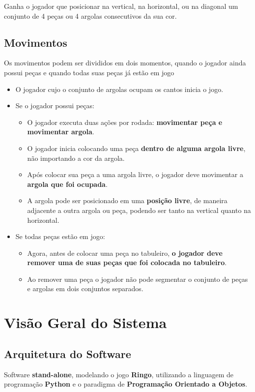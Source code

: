 \documentclass[12pt]{article}
\begin{document}
Ganha o jogador que posicionar na vertical, na horizontal, ou na diagonal um conjunto de 4 peças ou 4 argolas consecutivos da sua cor.

\bigskip

\subsection{Movimentos}

Os movimentos podem ser divididos em dois momentos,
quando o jogador ainda possui peças e quando todas suas peças já estão em jogo

\begin{itemize}
    \item O jogador cujo o conjunto de argolas ocupam os cantos inicia o jogo.
    \item Se o jogador possui peças:

    \begin{itemize}
        \item O jogador executa duas ações por rodada: \textbf{movimentar peça e movimentar argola}.
        \item O jogador inicia colocando uma peça \textbf{dentro de alguma argola livre}, não importando a cor da argola.
        \item Após colocar sua peça a uma argola livre, o jogador deve movimentar a \textbf{argola que foi ocupada}.
        \item A argola pode ser posicionado em uma \textbf{posição livre}, de maneira adjacente a outra argola ou peça, podendo ser tanto na vertical quanto na horizontal.
    \end{itemize}
    \item Se todas peças estão em jogo:
    \begin{itemize}
        \item Agora, antes de colocar uma peça no tabuleiro, \textbf{o jogador deve remover uma de suas peças que foi colocada no tabuleiro}.
        \item Ao remover uma peça o jogador não pode segmentar o conjunto de peças e argolas em dois conjuntos separados.
    \end{itemize}
\end{itemize}


\section{Visão Geral do Sistema}

\subsection{Arquitetura do Software}
Software \textbf{stand-alone}, modelando o jogo \textbf{Ringo}, utilizando a linguagem de programação \textbf{Python} e o paradigma de \textbf{Programação Orientado a Objetos}.
\end{document}
